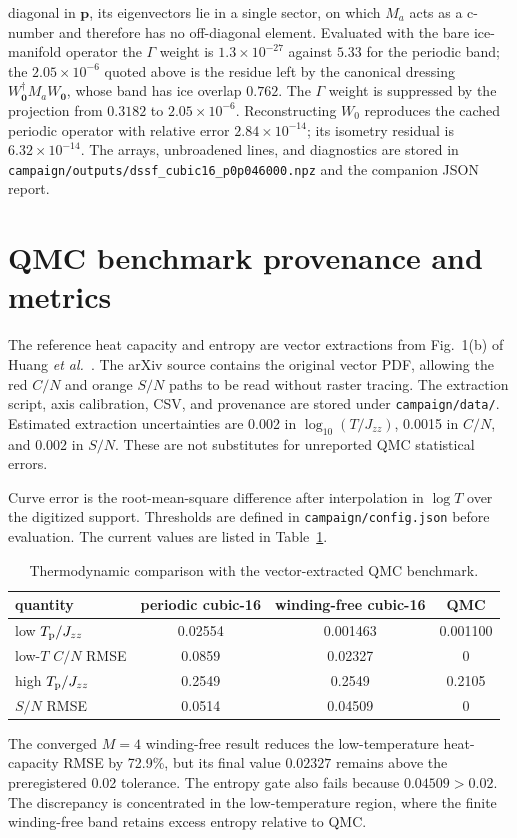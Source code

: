 \documentclass[aps,prl,onecolumn,amsmath,amssymb]{revtex4-2}
\newcommand{\Jzz}{J_{zz}}
\begin{document}
diagonal in $\bm p$, its eigenvectors lie in a single sector, on which $M_a$
acts as a c-number and therefore has no off-diagonal element.  Evaluated with
the bare ice-manifold operator the $\Gamma$ weight is $1.3\times10^{-27}$
against $5.33$ for the periodic band; the $2.05\times10^{-6}$ quoted above is
the residue left by the canonical dressing $W_{\bm0}^\dagger M_aW_{\bm0}$,
whose band has ice overlap $0.762$.  The $\Gamma$ weight is suppressed by the projection from $0.3182$ to
$2.05\times10^{-6}$.  Reconstructing $W_0$ reproduces the cached periodic operator with
relative error $2.84\times10^{-14}$; its isometry residual is
$6.32\times10^{-14}$.  The arrays, unbroadened lines, and diagnostics are
stored in \texttt{campaign/outputs/dssf\_cubic16\_p0p046000.npz} and the
companion JSON report.

\section{QMC benchmark provenance and metrics}

The reference heat capacity and entropy are vector extractions from
Fig.~1(b) of Huang \emph{et al.}~\cite{Huang2018}.  The arXiv source contains
the original vector PDF, allowing the red $C/N$ and orange $S/N$ paths to be
read without raster tracing.  The extraction script, axis calibration, CSV,
and provenance are stored under \texttt{campaign/data/}.  Estimated
extraction uncertainties are 0.002 in $\log_{10}(T/\Jzz)$, 0.0015 in $C/N$,
and 0.002 in $S/N$.  These are not substitutes for unreported QMC statistical
errors.

Curve error is the root-mean-square difference after interpolation in
$\log T$ over the digitized support.  Thresholds are defined in
\texttt{campaign/config.json} before evaluation.  The current values are
listed in Table~\ref{tab:qmc_metrics}.
\begin{table}[htbp]
\caption{Thermodynamic comparison with the vector-extracted QMC benchmark.}
\label{tab:qmc_metrics}
\centering
\begin{tabular}{lccc}
\toprule
quantity & periodic cubic-16 & winding-free cubic-16 & QMC\\
\midrule
low $T_{\rm p}/\Jzz$ & 0.02554 & 0.001463 & 0.001100\\
low-$T$ $C/N$ RMSE & 0.0859 & 0.02327 & 0\\
high $T_{\rm p}/\Jzz$ & 0.2549 & 0.2549 & 0.2105\\
$S/N$ RMSE & 0.0514 & 0.04509 & 0\\
\bottomrule
\end{tabular}
\end{table}
The converged $M=4$ winding-free result reduces the low-temperature heat-capacity RMSE by
72.9\%, but its final value $0.02327$ remains above the preregistered 0.02
tolerance.  The entropy gate also fails because $0.04509>0.02$.  The
discrepancy is concentrated in the low-temperature region, where the finite
winding-free band retains excess entropy relative to QMC.
\end{document}
